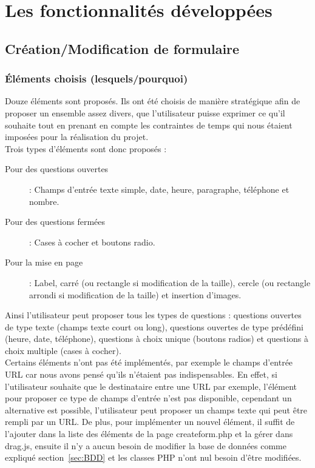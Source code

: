 \documentclass{sigplanconf}
\begin{document}
\section{Les fonctionnalités développées}
\subsection{Création/Modification de formulaire}
\subsubsection{Éléments choisis (lesquels/pourquoi)}
Douze éléments sont proposés. Ils ont été choisis de manière stratégique afin de proposer un ensemble assez divers, que l’utilisateur puisse exprimer ce qu’il souhaite tout en prenant en compte les contraintes de temps qui nous étaient imposées pour la réalisation du projet.\\
Trois types d'éléments sont donc proposés :
\begin{description}
\item [Pour des questions ouvertes] : Champs d'entrée texte simple, date, heure, paragraphe, téléphone et nombre.
\item [Pour des questions fermées] : Cases à cocher et boutons radio.
\item [Pour la mise en page] : Label, carré (ou rectangle si modification de la taille), cercle (ou rectangle arrondi si modification de la taille) et insertion d'images.
\end{description}
Ainsi l’utilisateur peut proposer tous les types de questions : questions ouvertes de type texte (champs texte court ou long), questions ouvertes de type prédéfini (heure, date, téléphone), questions à choix unique (boutons radios) et questions à choix multiple (cases à cocher).\\
Certains éléments n'ont pas été implémentés, par exemple le champs d'entrée URL car nous avons pensé qu'ils n'étaient pas indispensables. En effet, si l'utilisateur souhaite que le destinataire entre une URL par exemple, l'élément pour proposer ce type de champs d'entrée n'est pas disponible, cependant un alternative est possible, l'utilisateur peut proposer un champs texte qui peut être rempli par un URL. De plus, pour implémenter un nouvel élément, il suffit de l'ajouter dans la liste des éléments de la page createform.php et la gérer dans drag.js, ensuite il n'y a aucun besoin de modifier la base de données comme expliqué section~\ref{sec:BDD} et les classes PHP n'ont nul besoin d'être modifiées.
\end{document}
